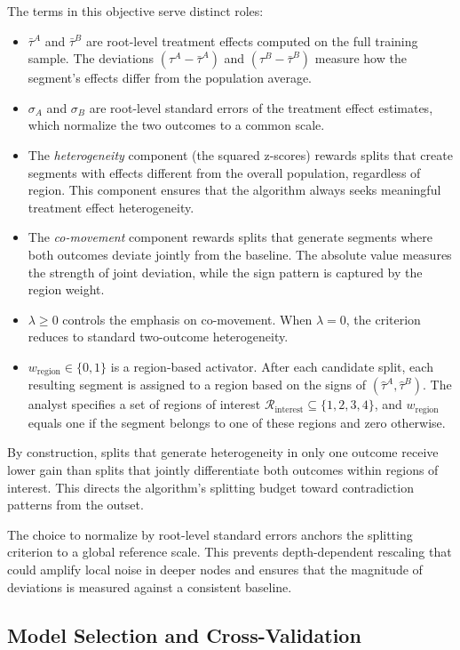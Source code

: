 \documentclass[11pt,letterpaper,english]{article}
\theoremstyle{definition}
\theoremstyle{definition}
\begin{document}
\begin{bibunit}
The terms in this objective serve distinct roles:
\begin{itemize}[leftmargin=2em]
    \item $\bar{\tau}^A$ and $\bar{\tau}^B$ are root-level treatment effects computed on the full training sample. The deviations $(\tau^A - \bar{\tau}^A)$ and $(\tau^B - \bar{\tau}^B)$ measure how the segment's effects differ from the population average.
    \item $\sigma_A$ and $\sigma_B$ are root-level standard errors of the treatment effect estimates, which normalize the two outcomes to a common scale.
    \item The \emph{heterogeneity} component (the squared z-scores) rewards splits that create segments with effects different from the overall population, regardless of region. This component ensures that the algorithm always seeks meaningful treatment effect heterogeneity.
    \item The \emph{co-movement} component rewards splits that generate segments where both outcomes deviate jointly from the baseline. The absolute value measures the strength of joint deviation, while the sign pattern is captured by the region weight.
    \item $\lambda \geq 0$ controls the emphasis on co-movement. When $\lambda = 0$, the criterion reduces to standard two-outcome heterogeneity.
    \item $w_{\text{region}} \in \{0,1\}$ is a region-based activator. After each candidate split, each resulting segment is assigned to a region based on the signs of $(\hat{\tau}^A, \hat{\tau}^B)$. The analyst specifies a set of regions of interest $\mathcal{R}_{\text{interest}} \subseteq \{1,2,3,4\}$, and $w_{\text{region}}$ equals one if the segment belongs to one of these regions and zero otherwise.
\end{itemize}

By construction, splits that generate heterogeneity in only one outcome receive lower gain than splits that jointly differentiate both outcomes within regions of interest. This directs the algorithm's splitting budget toward contradiction patterns from the outset.

The choice to normalize by root-level standard errors anchors the splitting criterion to a global reference scale. This prevents depth-dependent rescaling that could amplify local noise in deeper nodes and ensures that the magnitude of deviations is measured against a consistent baseline.

\subsection{Model Selection and Cross-Validation}
\label{sec:model_selection}


\end{bibunit}
\end{document}
